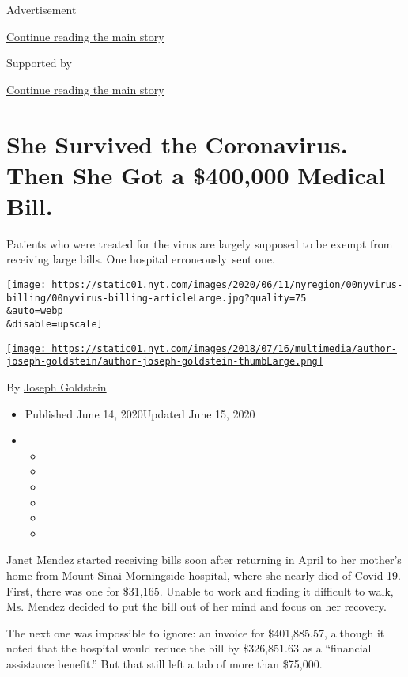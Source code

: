 Advertisement

\protect\hyperlink{after-top}{Continue reading the main story}

Supported by

\protect\hyperlink{after-sponsor}{Continue reading the main story}

\hypertarget{she-survived-the-coronavirus-then-she-got-a-400000-medical-bill}{%
\section{She Survived the Coronavirus. Then She Got a \$400,000 Medical
Bill.}\label{she-survived-the-coronavirus-then-she-got-a-400000-medical-bill}}

Patients who were treated for the virus are largely supposed to be
exempt from receiving large bills. One hospital erroneously~sent one.

\texttt{[image: https://static01.nyt.com/images/2020/06/11/nyregion/00nyvirus-billing/00nyvirus-billing-articleLarge.jpg?quality=75\\\&auto=webp\\\&disable=upscale]}

\href{https://www.nytimes.com/by/joseph-goldstein}{\texttt{[image: https://static01.nyt.com/images/2018/07/16/multimedia/author-joseph-goldstein/author-joseph-goldstein-thumbLarge.png]}}

By \href{https://www.nytimes.com/by/joseph-goldstein}{Joseph Goldstein}

\begin{itemize}
\item
  Published June 14, 2020Updated June 15, 2020
\item
  \begin{itemize}
  \item
  \item
  \item
  \item
  \item
  \item
  \end{itemize}
\end{itemize}

Janet Mendez started receiving bills soon after returning in April to
her mother's home from Mount Sinai Morningside hospital, where she
nearly died of Covid-19. First, there was one for \$31,165. Unable to
work and finding it difficult to walk, Ms. Mendez decided to put the
bill out of her mind and focus on her recovery.

The next one was impossible to ignore: an invoice for \$401,885.57,
although it noted that the hospital would reduce the bill by
\$326,851.63 as a ``financial assistance benefit.'' But that still left
a tab of more than \$75,000.


